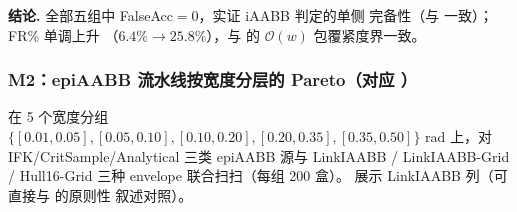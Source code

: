 \documentclass[journal]{IEEEtran}
\begin{document}
\begin{table}[ht]
\centering
\caption{腐蚀对偶性验证（iAABB 保守判定 vs.\ 200 点暴力采样，每组 500 盒）。}
\label{tab:m1_erosion}
\end{table}

\textbf{结论.} 全部五组中 FalseAcc$=0$，实证 iAABB 判定的单侧
完备性（与  一致）；FR\% 单调上升
（$6.4\%\!\to\!25.8\%$），与  的
$\mathcal{O}(w)$ 包覆紧度界一致。

\subsubsection{M2：epiAABB 流水线按宽度分层的 Pareto（对应 ）}
在 5 个宽度分组 $\{[0.01,0.05],[0.05,0.10],[0.10,0.20],[0.20,0.35],[0.35,0.50]\}$ rad
上，对 IFK/CritSample/Analytical 三类 epiAABB 源与
LinkIAABB / LinkIAABB-Grid / Hull16-Grid 三种 envelope 联合扫扫（每组 200 盒）。
 展示 LinkIAABB 列（可直接与  的原则性
叙述对照）。
\end{document}
